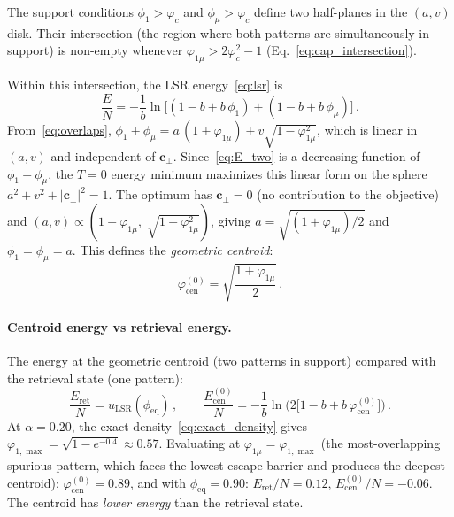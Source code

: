 \documentclass[11pt]{article}
\begin{document}
The support conditions $\phi_1 > \varphi_c$ and $\phi_\mu > \varphi_c$ define two half-planes in the $(a,v)$ disk.  Their intersection (the region where both patterns are simultaneously in support) is non-empty whenever $\varphi_{1\mu} > 2\varphi_c^2 - 1$ (Eq.~\eqref{eq:cap_intersection}).

Within this intersection, the LSR energy~\eqref{eq:lsr} is
\begin{equation}
\frac{E}{N} = -\frac{1}{b}\ln\!\big[(1-b+b\,\phi_1) + (1-b+b\,\phi_\mu)\big]\,.
\label{eq:E_two}
\end{equation}
From~\eqref{eq:overlaps}, $\phi_1 + \phi_\mu = a\,(1+\varphi_{1\mu}) + v\sqrt{1-\varphi_{1\mu}^2}$, which is linear in $(a,v)$ and independent of $\mathbf{c}_\perp$.  Since~\eqref{eq:E_two} is a decreasing function of $\phi_1 + \phi_\mu$, the $T = 0$ energy minimum maximizes this linear form on the sphere $a^2 + v^2 + |\mathbf{c}_\perp|^2 = 1$.  The optimum has $\mathbf{c}_\perp = 0$ (no contribution to the objective) and $(a,v) \propto (1+\varphi_{1\mu},\;\sqrt{1-\varphi_{1\mu}^2})$, giving $a = \sqrt{(1+\varphi_{1\mu})/2}$ and $\phi_1 = \phi_\mu = a$.  This defines the \emph{geometric centroid}:
\begin{equation}
\varphi_{\mathrm{cen}}^{(0)} = \sqrt{\frac{1+\varphi_{1\mu}}{2}}\,.
\label{eq:centroid}
\end{equation}

\paragraph{Centroid energy vs retrieval energy.}
The energy at the geometric centroid (two patterns in support) compared with the retrieval state (one pattern):
\begin{equation}
\frac{E_{\mathrm{ret}}}{N} = u_{\mathrm{LSR}}(\phi_{\mathrm{eq}})\,,\qquad
\frac{E_{\mathrm{cen}}^{(0)}}{N} = -\frac{1}{b}\ln\!\Big(2\big[1-b+b\,\varphi_{\mathrm{cen}}^{(0)}\big]\Big)\,.
\label{eq:E_compare}
\end{equation}
At $\alpha = 0.20$, the exact density~\eqref{eq:exact_density} gives $\varphi_{1,\max} = \sqrt{1-e^{-0.4}} \approx 0.57$.  Evaluating at $\varphi_{1\mu} = \varphi_{1,\max}$ (the most-overlapping spurious pattern, which faces the lowest escape barrier and produces the deepest centroid): $\varphi_{\mathrm{cen}}^{(0)} = 0.89$, and with $\phi_{\mathrm{eq}} = 0.90$: $E_{\mathrm{ret}}/N = 0.12$, $E_{\mathrm{cen}}^{(0)}/N = -0.06$.  The centroid has \emph{lower energy} than the retrieval state.
\end{document}
